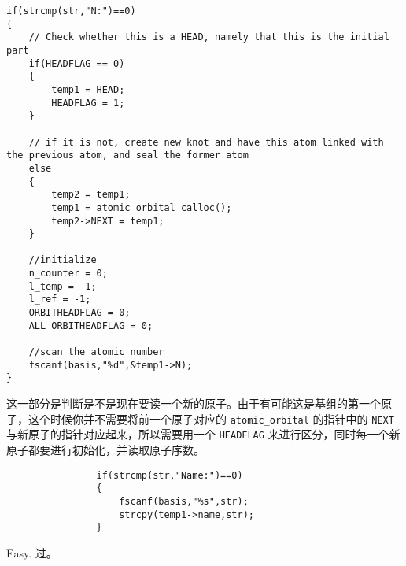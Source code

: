 \documentclass[12pt,a4paper,openany,twoside]{article}
\numberwithin{equation}{section}
\begin{document}
            \begin{lstlisting}
if(strcmp(str,"N:")==0)
{
    // Check whether this is a HEAD, namely that this is the initial part
    if(HEADFLAG == 0)
    {
        temp1 = HEAD;
        HEADFLAG = 1;
    }

    // if it is not, create new knot and have this atom linked with the previous atom, and seal the former atom
    else
    {
        temp2 = temp1;
        temp1 = atomic_orbital_calloc();
        temp2->NEXT = temp1;
    }

    //initialize
    n_counter = 0;
    l_temp = -1;
    l_ref = -1;
    ORBITHEADFLAG = 0;
    ALL_ORBITHEADFLAG = 0;     

    //scan the atomic number
    fscanf(basis,"%d",&temp1->N);
}
            \end{lstlisting}

            这一部分是判断是不是现在要读一个新的原子。由于有可能这是基组的第一个原子，这个时候你并不需要将前一个原子对应的 \lstinline$atomic_orbital$ 的指针中的 \lstinline$NEXT$ 与新原子的指针对应起来，所以需要用一个 \lstinline$HEADFLAG$ 来进行区分，同时每一个新原子都要进行初始化，并读取原子序数。

            \begin{lstlisting}
                if(strcmp(str,"Name:")==0)
                {
                    fscanf(basis,"%s",str);
                    strcpy(temp1->name,str);
                }
            \end{lstlisting}
            Easy. 过。
            
\end{document}
